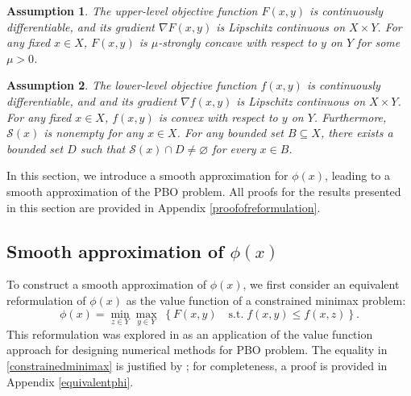\documentclass{article}
\newtheorem{assumption}{Assumption}
\begin{document}
    \begin{assumption}\label{assum1}
     The upper-level objective function $F(x,y)$ is continuously differentiable, and its gradient $\nabla F(x,y)$ is Lipschitz continuous on $X \times Y$. For any fixed $x \in X$, $F(x,y)$ is $\mu$-strongly concave with respect to $y$ on $Y$ for some $\mu > 0$.
    \end{assumption}
    \begin{assumption}\label{assum2}
    The lower-level objective function $f(x,y)$ is continuously differentiable, and and its gradient $\nabla f(x,y)$ is Lipschitz continuous on $X \times Y$. For any fixed $x \in X$, $f(x,y)$ is convex with respect to $y$ on $Y$. Furthermore, $\mathcal{S}(x)$ is nonempty for any $x \in X$. For any bounded set $B \subseteq X$, there exists a bounded set $D$ such that $\mathcal{S}(x) \cap D \neq \varnothing$ for every $x \in B$.
    \end{assumption}



In this section, we introduce a smooth approximation for $\phi(x)$, leading to a smooth approximation of the PBO problem. 
All proofs for the results presented in this section are provided in Appendix \ref{proofofreformulation}.

\subsection{Smooth approximation of $\phi(x)$}

To construct a smooth approximation of $\phi(x)$, we first consider an equivalent reformulation of  $\phi(x)$ as the value function of a constrained minimax problem:
    \begin{equation}\label{constrainedminimax}
    \phi(x) =\min_{ z\in {Y} } \max_{y\in {Y}}\; \left\{ F(x, y) \quad \text{s.t.} \; f(x,y)\le f(x,z) \right\}.
	\end{equation} 
This reformulation was explored in \cite{zeng2020practical} as an application of the value function approach for designing numerical methods for PBO problem. The equality in \eqref{constrainedminimax} is justified by \cite[Lemmas 1, 2]{zeng2020practical}; for completeness, a proof is provided in Appendix \ref{equivalentphi}.
\end{document}
